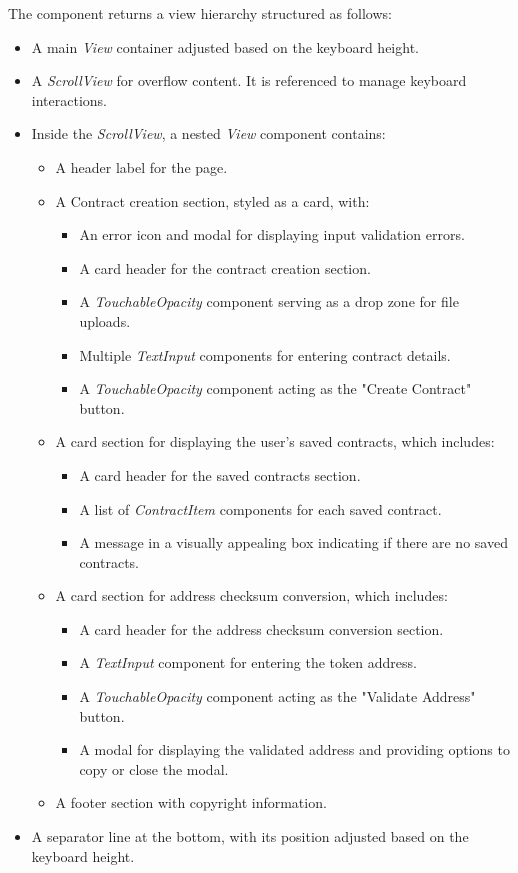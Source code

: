 The component returns a view hierarchy structured as follows:

\begin{itemize}
    \item A main \textit{View} container adjusted based on the keyboard height.
    \item A \textit{ScrollView} for overflow content. It is referenced to manage keyboard interactions.
    \item Inside the \textit{ScrollView}, a nested \textit{View} component contains:
    \begin{itemize}
        \item A header label for the page.
        \item A Contract creation section, styled as a card, with:
        \begin{itemize}
            \item An error icon and modal for displaying input validation errors.
            \item A card header for the contract creation section.
            \item A \textit{TouchableOpacity} component serving as a drop zone for file uploads.
            \item Multiple \textit{TextInput} components for entering contract details.
            \item A \textit{TouchableOpacity} component acting as the "Create Contract" button.
        \end{itemize}
        \item A card section for displaying the user's saved contracts, which includes:
        \begin{itemize}
            \item A card header for the saved contracts section.
            \item A list of \textit{ContractItem} components for each saved contract.
            \item A message in a visually appealing box indicating if there are no saved contracts.
        \end{itemize}
        \item A card section for address checksum conversion, which includes:
        \begin{itemize}
            \item A card header for the address checksum conversion section.
            \item A \textit{TextInput} component for entering the token address.
            \item A \textit{TouchableOpacity} component acting as the "Validate Address" button.
            \item A modal for displaying the validated address and providing options to copy or close the modal.
        \end{itemize}
        \item A footer section with copyright information.
    \end{itemize}
    \item A separator line at the bottom, with its position adjusted based on the keyboard height.
\end{itemize}

